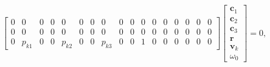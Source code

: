 \documentclass{article}
\newcommand{\mbf}[1]{\mathbf{#1}}
\begin{document}
\begin{align}
\begin{bmatrix}
        0 & 0 & 0 & 0 & 0 & 0 & 0 & 0 & 0 & 0 & 0 & 0 & 0 & 0 & 0 & 0 & 0 \\
        0 & 0 & 0 & 0 & 0 & 0 & 0 & 0 & 0 & 0 & 0 & 0 & 0 & 0 & 0 & 0 & 0 \\
        0 & p_{k1} & 0 & 0 & p_{k2} & 0 & 0 & p_{k3} & 0 & 0 & 1 & 0 & 0 & 0 & 0 & 0 & 0
    \end{bmatrix}
    \begin{bmatrix}
        \mbf{c}_1 \\
        \mbf{c}_2 \\
        \mbf{c}_3 \\
        \mbf{r} \\
        \mbf{v}_k \\
        \omega_0
    \end{bmatrix} = 0,
\end{align}
\end{document}
